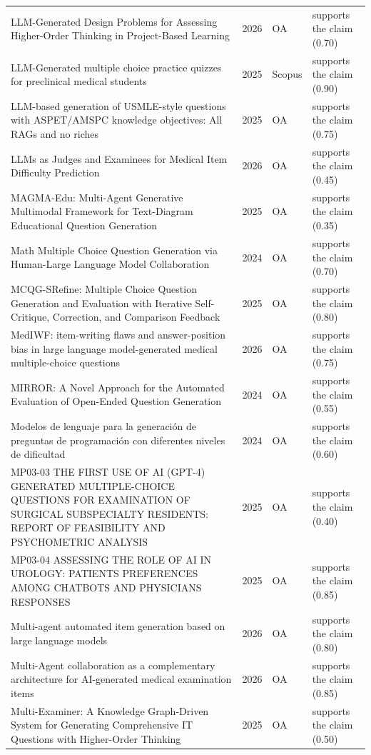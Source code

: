 \begin{longtable}{@{}%
  >{\raggedright\arraybackslash}p{}c%
  >{\raggedright\arraybackslash}p{}%
  >{\raggedright\arraybackslash}p{}@{}}
LLM-Generated Design Problems for Assessing Higher-Order Thinking in Project-Based Learning & 2026 & OA & supports the claim (0.70) \\
LLM-Generated multiple choice practice quizzes for preclinical medical students & 2025 & Scopus & supports the claim (0.90) \\
LLM-based generation of USMLE-style questions with ASPET/AMSPC knowledge objectives: All RAGs and no riches & 2025 & OA & supports the claim (0.75) \\
LLMs as Judges and Examinees for Medical Item Difficulty Prediction & 2026 & OA & supports the claim (0.45) \\
MAGMA-Edu: Multi-Agent Generative Multimodal Framework for Text-Diagram Educational Question Generation & 2025 & OA & supports the claim (0.35) \\
Math Multiple Choice Question Generation via Human-Large Language Model Collaboration & 2024 & OA & supports the claim (0.70) \\
MCQG-SRefine: Multiple Choice Question Generation and Evaluation with Iterative Self-Critique, Correction, and Comparison Feedback & 2025 & OA & supports the claim (0.80) \\
MedIWF: item-writing flaws and answer-position bias in large language model-generated medical multiple-choice questions & 2026 & OA & supports the claim (0.75) \\
MIRROR: A Novel Approach for the Automated Evaluation of Open-Ended Question Generation & 2024 & OA & supports the claim (0.55) \\
Modelos de lenguaje para la generación de preguntas de programación con diferentes niveles de dificultad & 2024 & OA & supports the claim (0.60) \\
MP03-03 THE FIRST USE OF AI (GPT-4) GENERATED MULTIPLE-CHOICE QUESTIONS FOR EXAMINATION OF SURGICAL SUBSPECIALTY RESIDENTS: REPORT OF FEASIBILITY AND PSYCHOMETRIC ANALYSIS & 2025 & OA & supports the claim (0.40) \\
MP03-04 ASSESSING THE ROLE OF AI IN UROLOGY: PATIENTS PREFERENCES AMONG CHATBOTS AND PHYSICIANS RESPONSES & 2025 & OA & supports the claim (0.85) \\
Multi-agent automated item generation based on large language models & 2026 & OA & supports the claim (0.80) \\
Multi-Agent collaboration as a complementary architecture for AI-generated medical examination items & 2026 & OA & supports the claim (0.85) \\
Multi-Examiner: A Knowledge Graph-Driven System for Generating Comprehensive IT Questions with Higher-Order Thinking & 2025 & OA & supports the claim (0.50) \\

\end{longtable}
